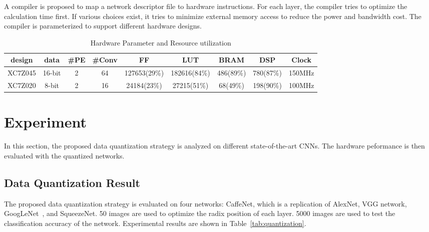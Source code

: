 \documentclass[10pt, conference, compsocconf]{IEEEtran}
\begin{document}
A compiler is proposed to map a network descriptor file to hardware instructions. For each layer, the compiler tries to optimize the calculation time first. If various choices exist, it tries to minimize external memory access to reduce the power and bandwidth cost. The compiler is parameterized to support different hardware designs.

\begin{table}[t]
    \centering
    \caption{Hardware Parameter and Resource utilization}
    \label{tab:resource}
    \scriptsize
    \begin{tabular}{|c|c|c|c|c|c|c|c|c|} \hline
        design & data & \#PE & \#Conv & FF & LUT & BRAM & DSP & Clock\\ \hline
        XC7Z045 & 16-bit & 2 & 64 & 127653(29\%) & 182616(84\%) & 486(89\%) & 780(87\%) & 150MHz\\ \hline
        XC7Z020 & 8-bit & 2 & 16 & 24184(23\%) & 27215(51\%) & 68(49\%) & 198(90\%) & 100MHz \\ \hline
    \end{tabular}
\end{table}

\section{Experiment}\label{sec:experiment}
In this section, the proposed data quantization strategy is analyzed on different state-of-the-art CNNs. The hardware peformance is then evaluated with the quantized networks.

\subsection{Data Quantization Result}
The proposed data quantization strategy is evaluated on four networks: CaffeNet, which is a replication of AlexNet, VGG network, GoogLeNet~\cite{szegedy2014going}, and SqueezeNet.
50 images are used to optimize the radix position of each layer. 5000 images are used to test the classification accuracy of the network. Experimental results are shown in Table~\ref{tab:quantization}.
\end{document}
